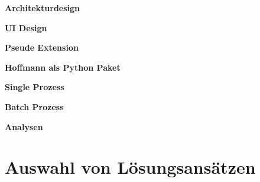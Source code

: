 \textbf{Architekturdesign}

\textbf{UI Design}

\textbf{Pseude Extension}

\textbf{Hoffmann als Python Paket}

\textbf{Single Prozess}

\textbf{Batch Prozess}

\textbf{Analysen}

\section{Auswahl von Lösungsansätzen}